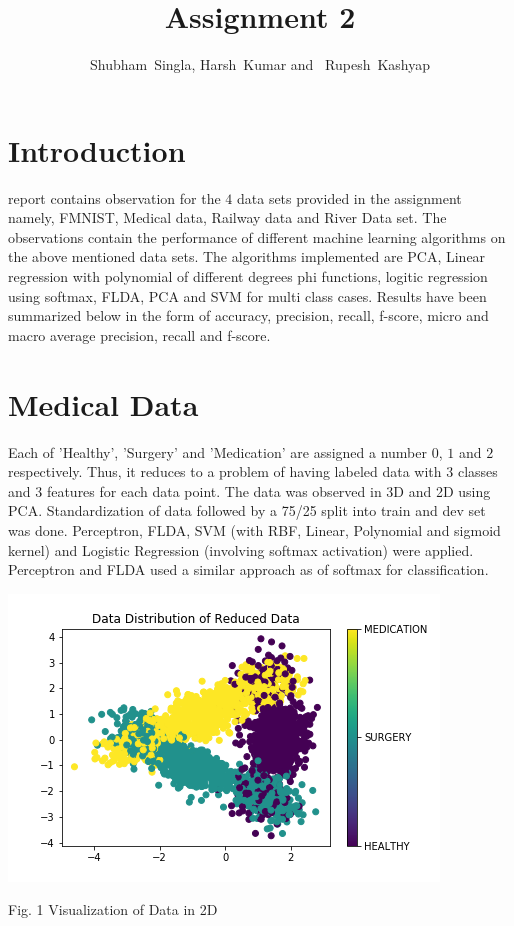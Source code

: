 \documentclass[12pt,journal,compsoc]{IEEEtran}
\begin{document}
%
\title{Assignment 2}

\author{Shubham~Singla,
        Harsh~Kumar and~
        Rupesh~Kashyap}%


\maketitle

\section{Introduction}
 report contains observation for the $4$ data sets provided in the assignment namely, FMNIST, Medical data, Railway data and River Data set. The observations contain the performance of different machine learning algorithms on the above mentioned data sets. The algorithms implemented are PCA, Linear regression with polynomial of different degrees phi functions, logitic regression using softmax, FLDA, PCA and SVM for multi class cases. Results have been summarized below in the form of accuracy, precision, recall, f-score, micro and macro average precision, recall and f-score.

\section{Medical Data}
\noindent Each of 'Healthy', 'Surgery' and 'Medication' are assigned a number $0$, $1$ and $2$ respectively. Thus, it reduces to a problem of having labeled data with $3$ classes and $3$ features for each data point. The data was observed in 3D and 2D using PCA. Standardization of data followed by a 75/25 split into train and dev set was done. Perceptron, FLDA, SVM (with RBF, Linear, Polynomial and sigmoid kernel) and Logistic Regression (involving softmax activation) were applied. Perceptron and FLDA used a similar approach as of softmax for classification.
\begin{center}
\includegraphics[scale=0.35]{2d_medical.png}

{\small Fig. 1 Visualization of Data in 2D}
\end{center}
\end{document}
